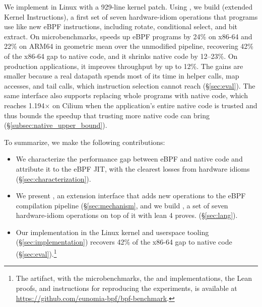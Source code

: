 We implement \tool in Linux with a 929-line kernel patch.
Using \tool, we build \lang (extended Kernel  Instructions), a first set of seven hardware-idiom operations that programs use like new eBPF instructions, including rotate, conditional select, and bit extract.
On microbenchmarks, \lang speeds up eBPF programs by 24\% on x86-64 and 22\% on ARM64 in geometric mean over the unmodified pipeline, recovering 42\% of the x86-64 gap to native code, and it shrinks native code by 12--23\%.
On production applications, it improves throughput by up to 12\%. The gains are smaller because a real datapath spends most of its time in helper calls, map accesses, and tail calls, which instruction selection cannot reach (\S\ref{sec:eval}).
The same interface also supports replacing whole programs with native code, which reaches 1.194$\times$ on Cilium when the application's entire native code is trusted and thus bounds the speedup that trusting more native code can bring (\S\ref{subsec:native_upper_bound}).

To summarize, we make the following contributions:
\begin{itemize}
    \item We characterize the performance gap between eBPF and native code and attribute it to the eBPF JIT, with the clearest losses from hardware idioms (\S\ref{sec:characterization}).
    \item We present \tool, an extension interface that adds new operations to the eBPF compilation pipeline (\S\ref{sec:mechanism}, and we build \lang, a set of seven hardware-idiom operations on top of it with lean 4 proves. (\S\ref{sec:lang}).
    \item Our implementation in the Linux kernel and userspace tooling (\S\ref{sec:implementation}) recovers 42\% of the x86-64 gap to native code (\S\ref{sec:eval}).\footnote{The artifact, with the microbenchmarks, the \tool and \lang implementations, the Lean proofs, and instructions for reproducing the experiments, is available at \url{https://github.com/eunomia-bpf/bpf-benchmark}.}
\end{itemize}
